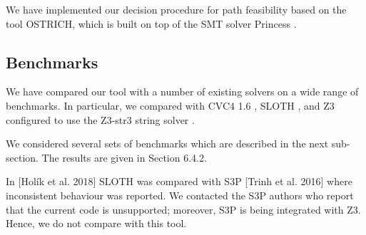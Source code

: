 

We have implemented our decision procedure for path feasibility based on the tool OSTRICH, which is built on top of the SMT solver Princess \cite{}. 
%


\subsection{Benchmarks}
 
We have compared our tool with a number of existing solvers on a wide range of benchmarks. In
particular, we compared  with CVC4 1.6 \cite{}, SLOTH \cite{},
and Z3 configured to use the Z3-str3 string solver \cite{}. 

We considered several sets
of benchmarks which are described in the next sub-section. The results are given in Section 6.4.2.


In [Holík et al. 2018] SLOTH was compared with S3P [Trinh et al. 2016] where inconsistent
behaviour was reported. We contacted the S3P authors who report that the current code is unsupported;
moreover, S3P is being integrated with Z3. Hence, we do not compare with this tool.


